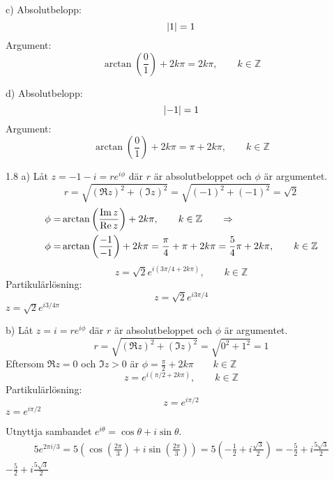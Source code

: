 \begin{task}{c)}
	Absolutbelopp:
	\[\left|1\right|=1\]
	Argument:
	\[\arctan\left(\frac{0}{1}\right)+2k\pi=2k\pi, \qquad k\in\mathbb{Z}\]
\end{task}

\begin{task}{d)}
	Absolutbelopp:
	\[\left|-1\right|=1\]
	Argument:
	\[\arctan\left(\frac{0}{1}\right)+2k\pi=\pi+2k\pi, \qquad k\in\mathbb{Z}\]
\end{task}

\begin{task}{1.8 a)}
	Låt $z = -1-i = re^{i\phi}$ där $r$ är absolutbeloppet och $\phi$ är argumentet.
	\[r=\sqrt{(\Re z)^2+(\Im z)^2}=
	\sqrt{(-1)^2+(-1)^2}=
	\sqrt{2}\]
	\begin{align*}
		\phi=&\arctan\left(\frac{\operatorname{Im} z}{\operatorname{Re} z}\right)+2k\pi, \qquad k \in \mathbb{Z} \qquad \operatorname{\Rightarrow} \\
		\phi=&\arctan\left(\frac{-1}{-1}\right)+2k\pi=
		\frac{\pi}{4}+\pi+2k\pi=
		\frac{5}{4}\pi+2k\pi, \qquad k \in \mathbb{Z}
	\end{align*}
	\[z=\sqrt{2}e^{i(3\pi/4+2k\pi)}, \qquad k \in \mathbb{Z}\]
	Partikulärlösning:
	\[z=\sqrt{2}e^{i3\pi/4}\]
	\ans $z=\sqrt{2}e^{i3/4\pi}$
\end{task}

\begin{task}{b)}
	Låt $z = i = re^{i\phi}$ där $r$ är absolutbeloppet och $\phi$ är argumentet.
	\[r=\sqrt{(\Re z)^2+(\Im z)^2}=
	\sqrt{0^2+1^2}=
	1\]
	Eftersom $\Re z = 0$ och $\Im z > 0$ är $\phi=\frac{\pi}{2} + 2k\pi \qquad k \in \mathbb{Z}$
	\[z=e^{i(\pi/2+2k\pi)}, \qquad k \in \mathbb{Z}\]
	Partikulärlösning:
	\[z=e^{i\pi/2}\]
	\ans $z=e^{i\pi/2}$
\end{task}

\begin{task}{1.9}
	Utnyttja sambandet $e^{i\theta}=\cos\theta+i\sin\theta$.
	\begin{align*}
		5e^{2\pi i/3}=
		5\left(\cos\left(\frac{2\pi}{3}\right)+i\sin\left(\frac{2\pi}{3}\right)\right)=
		5\left(-\frac{1}{2}+i\frac{\sqrt{3}}{2}\right)=
		-\frac{5}{2}+i\frac{5\sqrt{3}}{2}
	\end{align*}
	\ans $-\frac{5}{2}+i\frac{5\sqrt{3}}{2}$
\end{task}

